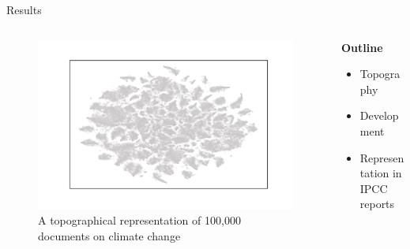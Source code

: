 \documentclass[9pt]{beamer}
\begin{document}
\begin{frame}{Results}

\begin{columns}
	\begin{column}{0.75\linewidth}
		\begin{figure}	
			\includegraphics[width=\linewidth]{../tsne_results/plots/run_662_s_100000_p30_blank}
			\caption{A topographical representation of 100,000 documents on climate change}
		\end{figure}
	\end{column}
	\begin{column}{0.25\linewidth}
		\textbf{Outline}	
		\begin{center}
			\begin{itemize}
				\item<2-> Topography
				\item<4-> Development
				\item<5-> Representation in IPCC reports
			\end{itemize}
		\end{center}
	\end{column}
\end{columns}

\end{frame}
\end{document}

